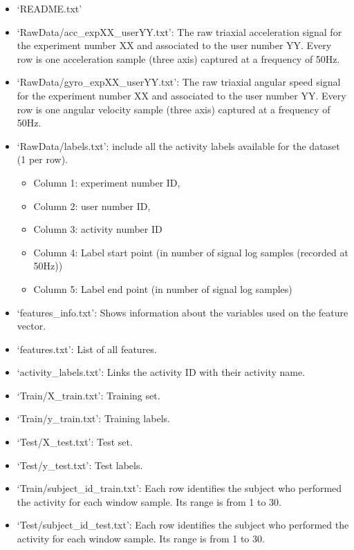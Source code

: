 \documentclass[
]{article}
\begin{document}
\begin{itemize}
\item
  `README.txt'
\item
  `RawData/acc\_expXX\_userYY.txt': The raw triaxial acceleration signal
  for the experiment number XX and associated to the user number YY.
  Every row is one acceleration sample (three axis) captured at a
  frequency of 50Hz.
\item
  `RawData/gyro\_expXX\_userYY.txt': The raw triaxial angular speed
  signal for the experiment number XX and associated to the user number
  YY. Every row is one angular velocity sample (three axis) captured at
  a frequency of 50Hz.
\item
  `RawData/labels.txt': include all the activity labels available for
  the dataset (1 per row).

  \begin{itemize}
  \item
    Column 1: experiment number ID,
  \item
    Column 2: user number ID,
  \item
    Column 3: activity number ID
  \item
    Column 4: Label start point (in number of signal log samples
    (recorded at 50Hz))
  \item
    Column 5: Label end point (in number of signal log samples)
  \end{itemize}
\item
  `features\_info.txt': Shows information about the variables used on
  the feature vector.
\item
  `features.txt': List of all features.
\item
  `activity\_labels.txt': Links the activity ID with their activity
  name.
\item
  `Train/X\_train.txt': Training set.
\item
  `Train/y\_train.txt': Training labels.
\item
  `Test/X\_test.txt': Test set.
\item
  `Test/y\_test.txt': Test labels.
\item
  `Train/subject\_id\_train.txt': Each row identifies the subject who
  performed the activity for each window sample. Its range is from 1 to
  30.
\item
  `Test/subject\_id\_test.txt': Each row identifies the subject who
  performed the activity for each window sample. Its range is from 1 to
  30.
\end{itemize}
\end{document}

